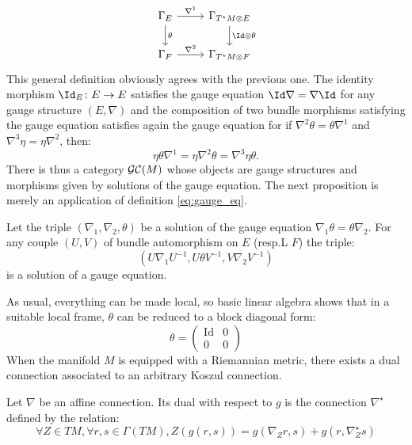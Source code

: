 \begin{equation}
    \label{eq:koszul_exterior_der}
    \begin{tikzcd}
    \Gamma_E \rar["\nabla^1"] \dar["\theta"] & \Gamma_{T^\star M  \otimes E} \dar["\Id \otimes \theta"]\\
    \Gamma_F \rar["\nabla^2"] & \Gamma_{T^\star M \otimes F}
    \end{tikzcd}
\end{equation}
This general definition obviously agrees with the previous one. The identity morphism $\Id_E \colon E \to E$ satisfies the gauge equation $\Id \nabla = \nabla \Id$ for any gauge structure $\left(E,\nabla\right)$ and the composition of two bundle morphisms satisfying the gauge equation satisfies again the gauge equation for if $\nabla^2 \theta = \theta \nabla^1$ and $\nabla^3 \eta = \eta \nabla^2$, then:
\[
\eta \theta \nabla^1 = \eta \nabla^2 \theta = \nabla^3 \eta \theta.
\]
There is thus a category $\mathcal{GC}(M)$ whose objects are gauge structures and morphisms given by solutions of the gauge equation.
The next proposition is merely an application of definition \ref{eq:gauge_eq}.
\begin{prop}
\label{prop:conjugate_connections}
Let the triple $\left(\nabla_1, \nabla_2,\theta \right)$ be a solution of the gauge equation $\nabla_1 \theta = \theta \nabla_2.$ 
For any couple $(U,V)$ of bundle automorphism on $E$ (resp.L $F$) the triple:
\[
\left( U \nabla_1 U^{-1}, U \theta V^{-1}, V \nabla_2 V^{-1} \right)
\]
is a solution of a gauge equation.
\end{prop}
As usual, everything can be made local, so basic linear algebra shows that in a suitable local frame, $\theta$ can be reduced to a block diagonal form:
\begin{equation}
    \label{eq:reduced_theta}
    \theta = \left( \begin{array}{c|c} \text{Id} & 0 \\ \hline
    0 & 0
    \end{array} \right)
\end{equation}
When the manifold $M$ is equipped with a Riemannian metric, there exists a dual connection associated to an arbitrary Koszul connection. 
\begin{defn}
    \label{def:conjugate_connection}
    Let $\nabla$ be an affine connection. Its dual with respect to $g$ is the connection $\nabla^\star$ defined by the relation:
    \begin{equation}
    \label{eq:conjugate_connection}
    \forall Z \in TM, \forall r,s \in \Gamma \left(TM 
    \right), Z\left( g(r,s) \right) = g\left(\nabla_Z r, s\right) + 
    g\left( r, \nabla_Z^\star s\right)
    \end{equation}
\end{defn}

